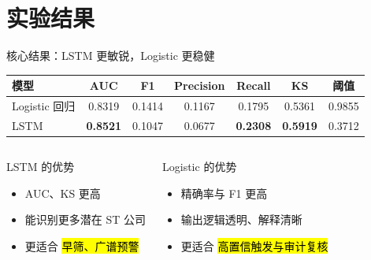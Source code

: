 \section{实验结果}

\begin{frame}{核心结果：LSTM 更敏锐，Logistic 更稳健}
  \begin{table}
    \centering
    \small
    \begin{tabular}{@{}lcccccc@{}}
      \toprule
      模型 & AUC & F1 & Precision & Recall & KS & 阈值 \\
      \midrule
      Logistic 回归 & 0.8319 & 0.1414 & 0.1167 & 0.1795 & 0.5361 & 0.9855 \\
      LSTM & \textbf{0.8521} & 0.1047 & 0.0677 & \textbf{0.2308} & \textbf{0.5919} & 0.3712 \\
      \bottomrule
    \end{tabular}
  \end{table}

  \begin{columns}[T,onlytextwidth]
    \begin{block}{LSTM 的优势}
      \begin{itemize}
        \item AUC、KS 更高
        \item 能识别更多潜在 ST 公司
        \item 更适合 \hl{早筛、广谱预警}
      \end{itemize}
    \end{block}

    \begin{exampleblock}{Logistic 的优势}
      \begin{itemize}
        \item 精确率与 F1 更高
        \item 输出逻辑透明、解释清晰
        \item 更适合 \hl{高置信触发与审计复核}
      \end{itemize}
    \end{exampleblock}
  \end{columns}
\end{frame}

